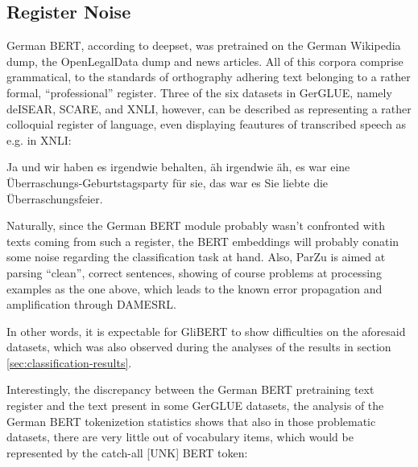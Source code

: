 \subsection{Register Noise}
\label{sec:register-noise}

German BERT, according to deepset, was pretrained on the German Wikipedia dump, the OpenLegalData dump and
news articles. All of this corpora comprise grammatical, to the standards of orthography adhering text
belonging to a rather formal, ``professional'' register. Three of the six datasets in GerGLUE, namely
deISEAR, SCARE, and XNLI, however, can be described as representing a rather colloquial register of
language, even displaying feautures of transcribed speech as e.g. in XNLI:

\begin{examples}
  \item Ja und wir haben es irgendwie behalten, äh irgendwie äh, es war eine Überraschungs-Geburtstagsparty für sie, das war es Sie liebte die Überraschungsfeier.
\end{examples}

Naturally, since the German BERT module probably wasn't confronted with texts coming from such a register,
the BERT embeddings will probably conatin some noise regarding the classification task at hand. Also, ParZu
is aimed at parsing ``clean'', correct sentences, showing of course problems at processing examples as the
one above, which leads to the known error propagation and amplification through DAMESRL.

In other words, it is expectable for GliBERT to show difficulties on the aforesaid datasets, which
was also observed during the analyses of the results in section \ref{sec:classification-results}.

Interestingly, the discrepancy between the German BERT pretraining text register and the text
present in some GerGLUE datasets, the analysis of the German BERT tokenizetion statistics shows
that also in those problematic datasets, there are very little out of vocabulary items, which
would be represented by the catch-all [UNK] BERT token:

